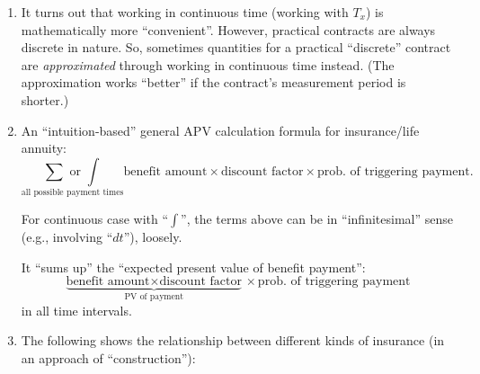 \begin{enumerate}
\item It turns out that working in continuous time (working with \(T_x\)) is
mathematically more ``convenient''. However, practical contracts are always
discrete in nature. So, sometimes quantities for a practical ``discrete''
contract are \emph{approximated} through working in continuous time instead.
(The approximation works ``better'' if the contract's measurement period is
shorter.)

\item
\label{it:gen-apv-fmla}
\ystar An ``intuition-based'' general APV calculation formula for
insurance/life annuity:
\[
\underset{\text{all possible payment times}}{\sum\text{ or }\int}\text{benefit amount}\times\text{discount
factor}\times\text{prob.\ of triggering payment}.
\]
\begin{note}
For continuous case with ``\(\int\)'', the terms above can be in
``infinitesimal'' sense (e.g., involving ``\(dt\)''), loosely.
\end{note}


\begin{intuition}
It ``sums up'' the ``expected present value of benefit payment'':
\[
\underbrace{\text{benefit amount}\times\text{discount factor}}_{\text{PV of payment}}
\times\text{prob.\ of triggering payment}
\]
in all time intervals.
\end{intuition}
\item \label{it:insurance-relationship}
The following shows the relationship between different kinds of insurance
(in an approach of ``construction''):

\end{enumerate}

